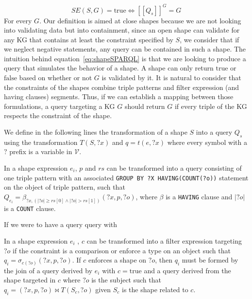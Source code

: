 \begin{equation}\label{eq:shapeSPARQL}
   SE(S,G) = \mathrm{true} \iff [\![ Q_s ]\!]^{G} =  G
\end{equation}
For every $G$.
Our definition is aimed at close shapes because we are not looking into validating data but into containment, since an open shape can validate 
for any KG that contains at least the constraint specified by $S$, we consider that if we neglect negative statements, any query can be contained in such a shape.
The intuition behind equation~\ref{eq:shapeSPARQL} is that we are looking to produce a query that simulates the behavior of a shape.
A shape can only return $\mathrm{true}$ or $\mathrm{false}$ based on whether or not $G$ is validated by it.
It is natural to consider that the constraints of the shapes combine triple patterns and filter expression (and having clauses) segments.
Thus, if we can establish a mapping between those formulations, a query targeting a KG $G$ should return $G$ if every triple of the 
KG respects the constraint of the shape.

We define in the following lines the transformation of a shape $S$ into a query $Q_s$ using the transformation $T(S,?x)$ and $q = t(e, ?x)$ where every 
symbol with a $?$ prefix is a variable in $\mathcal{V}$. 


\iffalse
INSPIRE YOURSELF BY Corman2019 style

We might want to reference that

https://labra.weso.es/publication/2023_kg_subsets_pregel/
https://labra.weso.es/publication/2024_extracting_shapes_consolidator/

https://labra.weso.es/publication/2023_rdf_data_integration/
\fi

\begin{prop}\label{prop:triplePattern}
   In a shape expression $e_i$, $p$ and $rs$ can be transformed into a query consisting of one triple pattern with an associated \texttt{GROUP BY ?X HAVING(COUNT(?o))} statement on the object of triple pattern,
   such that
   $Q_{e_i} = \beta_{?x, (|?o| \geq rs[0] \land |?o| > rs[1])}(?x, p, ?o)$,
   where $\beta$ is a \texttt{HAVING} clause and $|?o|$ is a \texttt{COUNT} clause. 
\end{prop}

If we were to have a query query with

\begin{prop}
   In a shape expression $e_i$ , $c$ can be transformed into a filter expression targeting $?o$ if the constraint is a comparison or enforce a type on an object such that
   $q_{i} = \sigma_{c(?o)}(?x, p, ?o)$. 
   If $c$ enforces a shape on $?o$, then $q_i$ must be formed by the join of a query derived by $e_i$ with $c = \mathrm{true}$ and a query derived from the shape targeted in $c$ where $?o$ is the subject 
   such that $q_{i}= (?x, p, ?o) \bowtie T(S_c,?o)$ given $S_c$ is the shape related to $c$.
\end{prop}

